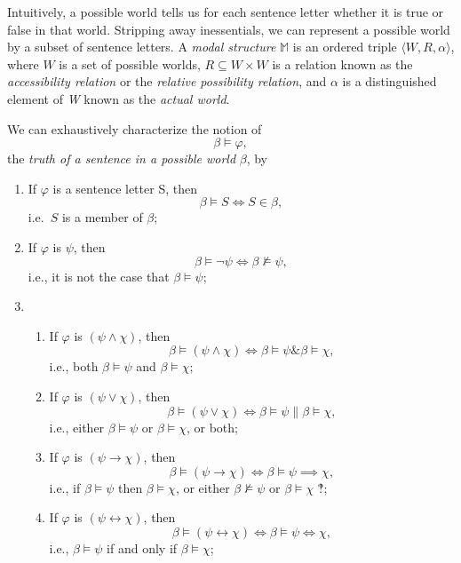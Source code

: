 \documentclass[
  12pt,
  letterpaper,
  DIV=11,
  numbers=noendperiod,
  twoside]{scrreprt}
\theoremstyle{remark}
\begin{document}
Intuitively, a possible world tells us for each sentence letter whether
it is true or false in that world. Stripping away inessentials, we can
represent a possible world by a subset of sentence letters. A
\emph{modal structure} \(\mathbb{M}\) is an ordered triple
\(\langle W, R,\alpha \rangle\), where \(W\) is a set of possible worlds, \(R\subseteq W\times W\) is a
relation known as the \emph{accessibility relation} or the
\emph{relative possibility relation}, and \(\alpha\) is a distinguished
element of \emph{W} known as the \emph{actual world}.

We can exhaustively characterize the notion of \[\beta \vDash \varphi,\]
the \emph{truth of a sentence in a possible world} \(\beta\), by

\begin{enumerate}
\def\labelenumi{(\arabic{enumi})}
\setcounter{enumi}{3}
\item
  If \(\varphi\) is a sentence letter S, then \[
  \beta\vDash S \iff S\in\beta,
  \] i.e.~\(S\) is a member of \(\beta\);
\item
  If \(\varphi\) is \(\psi\), then \[
  \beta\vDash \neg\psi \iff \beta\not\vDash\psi,
  \] i.e., it is not the case that \(\beta\vDash\psi\);
\item
  \begin{enumerate}
  \def\labelenumii{(\alph{enumii})}
  \item
    If \(\varphi\) is \((\psi\land\chi)\), then \[
    \beta\vDash (\psi\land\chi) \iff \beta\vDash\psi \mathrel{\&} \beta\vDash\chi,
    \] i.e., both \(\beta\vDash\psi\) and \(\beta\vDash\chi\);
  \item
    If \(\varphi\) is \((\psi\lor\chi)\), then \[
    \beta\vDash (\psi\lor\chi) \iff \beta\vDash\psi \mathrel{\|} \beta\vDash\chi,
    \] i.e., either \(\beta\vDash\psi\) or \(\beta\vDash\chi\), or both;
  \item
    If \(\varphi\) is \((\psi\to\chi)\), then \[
    \beta\vDash (\psi\to\chi) \iff \beta\vDash\psi\implies\chi,
    \] i.e., if \(\beta\vDash\psi\) then \(\beta\vDash\chi\), or either
    \(\beta\not\vDash\psi\) or \(\beta\vDash\chi\) ‽;
  \item
    If \(\varphi\) is \((\psi\leftrightarrow\chi)\), then \[
    \beta\vDash (\psi\leftrightarrow\chi) \iff \beta\vDash\psi\iff\chi,
    \] i.e., \(\beta\vDash\psi\) if and only if \(\beta\vDash\chi\);
  \end{enumerate}
\end{enumerate}
\end{document}
